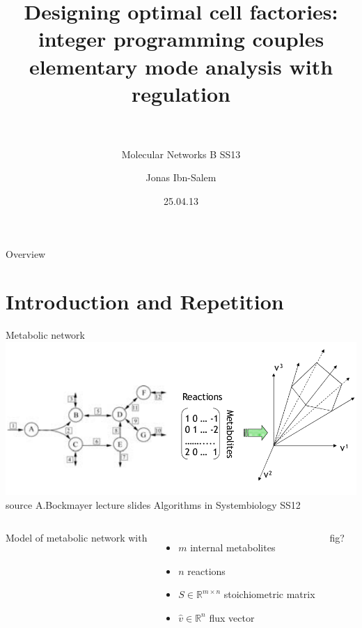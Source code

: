 \documentclass{beamer}
\title[Elementary flux mode analysis]{Designing optimal cell factories: integer programming couples elementary mode analysis with regulation\\~\\}
\subtitle{Molecular Networks B SS13}
\author[Jonas Ibn-Salem]{Jonas Ibn-Salem}
\institute[]{}
\date{25.04.13}
\begin{document}
\maketitle


\begin{frame}{Overview}
    \tableofcontents
\end{frame}

\section{Introduction and Repetition}

\begin{frame}{Metabolic network}
    \includegraphics[width=\textwidth]{grafik/modelling} \\
    \footnotesize{
        source A.Bockmayer lecture slides Algorithms in Systembiology SS12
        }
    \begin{columns}
        Model of metabolic network with
        \begin{itemize}
            \item $m$ internal metabolites
            \item $n$ reactions
            \item $S \in \mathbb{R}^{m\times n}$ stoichiometric matrix
            \item $\hat{v} \in \mathbb{R}^{n}$ flux vector
        \end{itemize}
        fig?
    \end{columns}
\end{frame}
\end{document}
